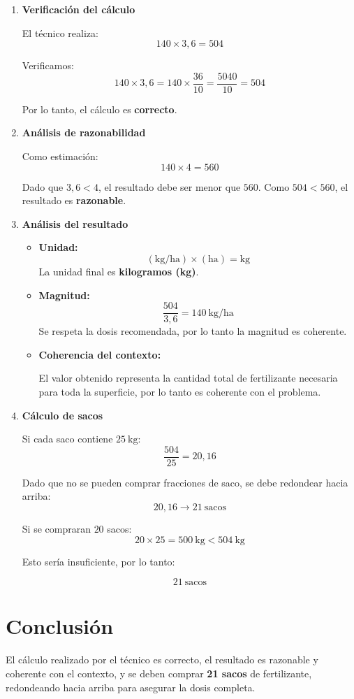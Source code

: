 \documentclass[12pt]{article}
\begin{document}
	\begin{enumerate}
	
			\item \textbf{Verificación del cálculo}
			
			El técnico realiza:
			\[
			140 \times 3{,}6 = 504
			\]
			
			Verificamos:
			\[
			140 \times 3{,}6 = 140 \times \frac{36}{10} = \frac{5040}{10} = 504
			\]
			
			Por lo tanto, el cálculo es \textbf{correcto}.
			
			\item \textbf{Análisis de razonabilidad}
			
			Como estimación:
			\[
			140 \times 4 = 560
			\]
			
			Dado que $3{,}6 < 4$, el resultado debe ser menor que $560$. Como $504 < 560$, el resultado es \textbf{razonable}.
			
			\item \textbf{Análisis del resultado}
			
			\begin{itemize}
				
				\item \textbf{Unidad:}
				\[
				(\text{kg/ha}) \times (\text{ha}) = \text{kg}
				\]
				La unidad final es \textbf{kilogramos (kg)}.
				
				\item \textbf{Magnitud:}
				\[
				\frac{504}{3{,}6} = 140 \ \text{kg/ha}
				\]
				Se respeta la dosis recomendada, por lo tanto la magnitud es coherente.
				
				\item \textbf{Coherencia del contexto:}
				
				El valor obtenido representa la cantidad total de fertilizante necesaria para toda la superficie, por lo tanto es coherente con el problema.
				
			\end{itemize}
			
			\item \textbf{Cálculo de sacos}
			
			Si cada saco contiene $25 \ \text{kg}$:
			\[
			\frac{504}{25} = 20{,}16
			\]
			
			Dado que no se pueden comprar fracciones de saco, se debe redondear hacia arriba:
			\[
			20{,}16 \rightarrow 21 \ \text{sacos}
			\]
			
			Si se compraran $20$ sacos:
			\[
			20 \times 25 = 500 \ \text{kg} < 504 \ \text{kg}
			\]
			
			Esto sería insuficiente, por lo tanto:
			
			\[
			\boxed{21 \ \text{sacos}}
			\]
			
		\end{enumerate}
		
		\section*{Conclusión}
		
		El cálculo realizado por el técnico es correcto, el resultado es razonable y coherente con el contexto, y se deben comprar \textbf{21 sacos} de fertilizante, redondeando hacia arriba para asegurar la dosis completa.
		
	
\end{document}
